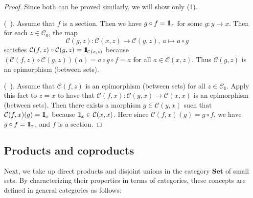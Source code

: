 \documentclass{surv-l}
\numberwithin{equation}{chapter}
\numberwithin{figure}{chapter}
\theoremstyle{plain}
\theoremstyle{definition}
\theoremstyle{remark}
\newcommand{\id}{1\kern-.25em{\text{{\rm l}}}}
\begin{document}
\begin{proof}
Since both can be proved similarly, we will show only (1).

(\text{$\Rightarrow$}\ \!).
Assume that $f$ is a section.
Then we have $g \circ f = \id_x$ for some $g \colon y \to x$.
Then for each $z  \in {\mathcal{C}}_0$, the map
\[
{\mathcal{C}}(g, z) \colon {\mathcal{C}}(x, z) \to {\mathcal{C}}(y, z), \ a \mapsto a \circ g
\]
satisfies ${\mathcal{C}}(f, z)\circ {\mathcal{C}}(g, z) = \id_{{\mathcal{C}}(x, z)}$
because $({\mathcal{C}}(f, z)\circ {\mathcal{C}}(g, z))(a) = a \circ g \circ f = a$ for all $a \in {\mathcal{C}}(x, z)$.
Thus ${\mathcal{C}}(g, z)$ is an epimorphism (between sets).

(\text{$\Leftarrow$}\ \!).
Assume that ${\mathcal{C}}(f, z)$ is an epimorphism (between sets) for all $z \in {\mathcal{C}}_0$.
Apply this fact to $z = x$ to have that ${\mathcal{C}}(f,x) \colon {\mathcal{C}}(y,x) \to {\mathcal{C}}(x,x)$
is an epimorphism (between sets).
Then there exists a morphism $g \in {\mathcal{C}}(y,x)$ such that ${\mathcal{C}}(f,x)(g) = \id_x$
because $\id_x \in {\mathcal{C}}(x,x)$.  Here since ${\mathcal{C}}(f,x)(g) = g \circ f$,
we have $g \circ f = \id_x$, and $f$ is a section.
\end{proof}

\subsection{Products and coproducts}

Next, we take up direct products and disjoint unions in the category $\mathbf{Set}$ of small sets.
By characterizing their properties in terms of categories,
these concepts are defined in general categories as follows:
\end{document}
